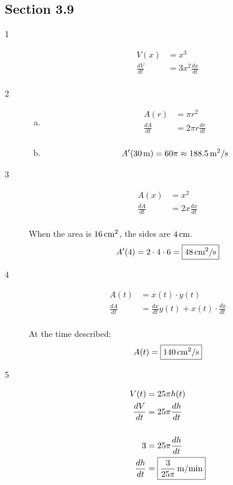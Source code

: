 \documentclass[letterpaper, landscape]{exam}
\begin{document}
  \subsection{Section 3.9}
  \begin{description}
    \item[1]
      \begin{align*}
        V(x)          & = x^3 \\
        \frac{dV}{dt} & = \boxed{ 3x^2 \frac{dx}{dt} } \\
      \end{align*}

    \item[2]
      \begin{enumerate}[(a)]
        \item 
          \begin{align*}
            A(r)          & = \pi r^2 \\
            \frac{dA}{dt} & = \boxed{ 2 \pi r \frac{dr}{dt} } \\
          \end{align*}

        \item 
          \[
            A'(\unit[30]{m}) = 60 \pi \approx \unit[188.5]{m^2/s}
          \]
      \end{enumerate}

    \item[3]
      \begin{align*}
        A(x)          & = x^2 \\
        \frac{dA}{dt} & = 2x \frac{dx}{dt} \\
      \end{align*}

      When the area is $\unit[16]{cm^2}$, the sides are $\unit[4]{cm}$.
      \[
        A'(4) = 2 \cdot 4 \cdot 6 = \boxed{ \unit[48]{cm^2/s} }
      \]

    \newpage

    \item[4]
      \begin{align*}
        A(t)          & = x(t) \cdot y(t) \\
        \frac{dA}{dt} & = \frac{dx}{dt} y(t) + x(t) \cdot \frac{dy}{dt} \\
      \end{align*}

      At the time described:
      \[
        A(t) = \boxed{ \unit[140]{cm^2/s} }
      \]

    \item[5]
      \begin{align*}
        V(t)          & = 25 \pi h(t) \\
        \frac{dV}{dt} & = 25 \pi \frac{dh}{dt} \\
        \\
        3             & = 25 \pi \frac{dh}{dt} \\
        \frac{dh}{dt} & = \boxed{ \unit[\frac{3}{25 \pi}]{m/min} } \\
      \end{align*}


\end{description}
\end{document}
